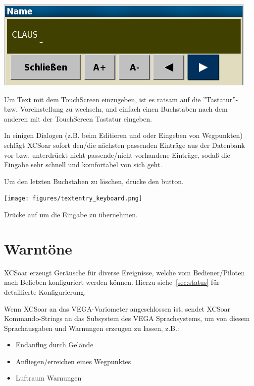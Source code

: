 \begin{center}
\includegraphics[angle=0,width=0.6\linewidth,keepaspectratio='true']{figures/textentry.png}
\end{center}

Um Text mit dem TouchScreen einzugeben, ist es ratsam auf die ''Tastatur''- bzw. Voreinstellung zu wechseln, und einfach einen Buchstaben nach dem anderen mit der TouchScreen Tastatur eingeben.

 In einigen Dialogen (z.B. beim Editieren und oder Eingeben von Wegpunkten) schlägt \textsf{XCSoar} sofort den/die nächsten passenden Einträge aus der Datenbank vor bzw. \tip  unterdrückt nicht passende/nicht vorhandene Einträge, sodaß die Eingabe sehr schnell und komfortabel von sich geht.

Um den letzten Buchstaben zu löschen, drücke den  \button{$<-$} button.

\begin{center}
\texttt{[image: figures/textentry\_keyboard.png]}
\end{center}

Drücke auf   um die Eingabe zu übernehmen.

\section{Warntöne}

\textsf{XCSoar} erzeugt Geräusche für diverse Ereignisse, welche vom Bediener/Piloten  nach Belieben konfiguriert werden können.
Hierzu siehe~\ref{sec:status} für detaillierte Konfigurierung.

Wenn \textsf{XCSoar} an das VEGA-Variometer angeschlossen ist,  sendet \textsf{XCSoar} Kommando-Strings an das Subsystem des VEGA Sprachsystems, um von diesem Sprachausgaben und Warnungen erzeugen zu lassen, z.B.:

\begin{itemize}
\item Endanflug durch Gelände
\item Anfliegen/erreichen eines Wegpunktes
\item Luftraum Warnungen
\end{itemize}

